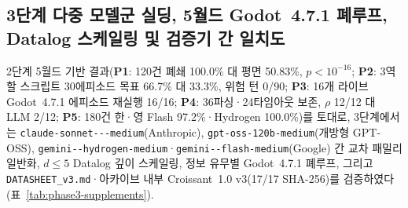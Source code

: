 \subsection{3단계 다중 모델군 실딩, 5월드 Godot~4.7.1 폐루프, Datalog 스케일링 및 검증기 간 일치도}\label{sec:phase3-supplements}
2단계 5월드 기반 결과(\textbf{P1}: 120건 폐쇄 100.0\% 대 평면 50.83\%, $p{<}10^{-16}$; \textbf{P2}: 3역할 스크립트 30에피소드 목표 66.7\% 대 33.3\%, 위험 턴 0/90; \textbf{P3}: 16개 라이브 Godot~4.7.1 에피소드 재실행 16/16; \textbf{P4}: 36파싱·24타임아웃 보존, $\rho$ 12/12 대 LLM 2/12; \textbf{P5}: 180건 한·영 Flash 97.2\%·Hydrogen 100.0\%)를 토대로, 3단계에서는 \texttt{claude-\allowbreak sonnet---\allowbreak medium}(Anthropic), \texttt{gpt-\allowbreak oss-\allowbreak 120b-\allowbreak medium}(개방형 GPT-OSS), \texttt{gemini--\allowbreak hydrogen-\allowbreak medium}·\texttt{gemini--\allowbreak flash-\allowbreak medium}(Google) 간 교차 패밀리 일반화, $d{\le}5$ Datalog 깊이 스케일링, 정보 유무별 Godot~4.7.1 폐루프, 그리고 \texttt{DATASHEET\_v3.md}·아카이브 내부 Croissant~1.0 v3(17/17 SHA-256)를 검증하였다(표~\ref{tab:phase3-supplements}).

